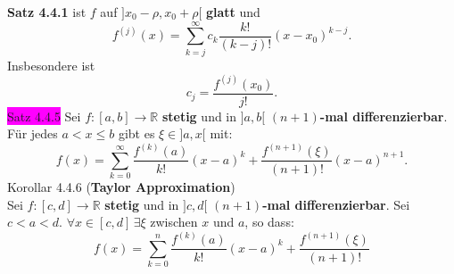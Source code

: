 \documentclass[landscape, 10pt]{article}
\newcommand{\R}{\mathbb{R}}
\begin{document}
\begin{multicols}{3}
                     \textbf{Satz 4.4.1} ist 
                     \textcolor{NavyBlue}{$f$} auf 
                     \textcolor{NavyBlue}{
                     $]x_0-\rho,x_0+\rho[$} 
                     \textbf{glatt} und
                     \begin{equation*}
                            f^{(j)}(x)
                            =\sum_{k=j}^\infty c_k
                            \frac{k!}{(k-j)!}(x-x_0)^{k-j}.
                     \end{equation*}
                     Insbesondere ist 
                     \begin{equation*}
                            c_j=\frac{f^{(j)}(x_0)}{j!}.  
                     \end{equation*}
              \vfill\null
              \columnbreak
              \colorbox{magenta}{Satz 4.4.5} 
                     Sei \textcolor{NavyBlue}{
                     $f:[a,b]\longrightarrow\R$}
                     \textbf{stetig} und in 
                     \textcolor{NavyBlue}{$]a,b[$} 
                     \textbf{$(n+1)$-mal differenzierbar}. 
                     Für jedes \textcolor{NavyBlue}{
                     $a<x\leqslant b$} gibt es 
                     \textcolor{NavyBlue}{$\xi\in]a,x[$} mit:
                     \begin{equation*}
                            f(x)
                            =\sum_{k=0}^\infty
                            \frac{f^{(k)}(a)}{k!}(x-a)^k
                            +\frac{f^{(n+1)}(\xi)}{(n+1)!}
                            (x-a)^{n+1}.
                     \end{equation*}
              \colorbox{BurntOrange}{Korollar 4.4.6} 
              (\textbf{Taylor Approximation}) \\
                     Sei \textcolor{NavyBlue}{
                     $f:[c,d]\longrightarrow\R$} 
                     \textbf{stetig} und in 
                     \textcolor{NavyBlue}{$]c,d[$} 
                     \textbf{$(n+1)$-mal differenzierbar}. Sei 
                     \textcolor{NavyBlue}{$c<a<d$}. 
                     \textcolor{NavyBlue}{
                     $\forall x\in[c,d]\,\exists\xi$} zwischen 
                     \textcolor{NavyBlue}{$x$} und 
                     \textcolor{NavyBlue}{$a$}, 
                     so dass: 
                     \begin{equation*}
                            f(x)=\sum_{k=0}^n
                            \frac{f^{(k)}(a)}{k!}(x-a)^k
                            +\frac{f^{(n+1)}(\xi)}{(n+1)!}

\end{equation*}
\end{multicols}
\end{document}
